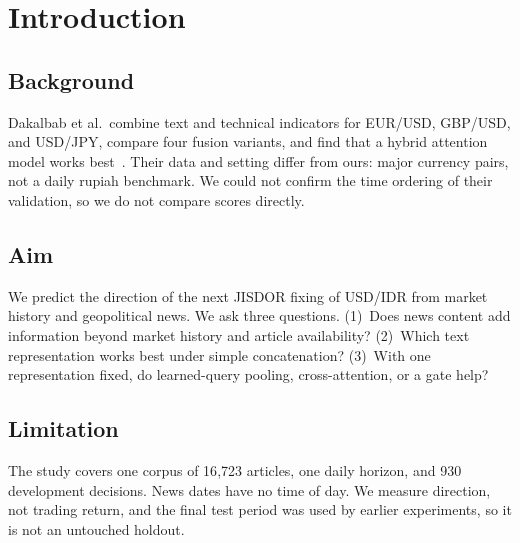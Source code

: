 \section{Introduction}
\label{sec:introduction}
\subsection{Background}
Dakalbab et al.\ combine text and technical indicators for EUR/USD, GBP/USD, and USD/JPY, compare four fusion variants, and find that a hybrid attention model works best~\cite{dakalbab2025}. Their data and setting differ from ours: major currency pairs, not a daily rupiah benchmark. We could not confirm the time ordering of their validation, so we do not compare scores directly.

\subsection{Aim}
We predict the direction of the next JISDOR fixing of USD/IDR from market history and geopolitical news. We ask three questions. (1)~Does news content add information beyond market history and article availability? (2)~Which text representation works best under simple concatenation? (3)~With one representation fixed, do learned-query pooling, cross-attention, or a gate help?

\subsection{Limitation}
The study covers one corpus of 16{,}723 articles, one daily horizon, and 930 development decisions. News dates have no time of day. We measure direction, not trading return, and the final test period was used by earlier experiments, so it is not an untouched holdout.
